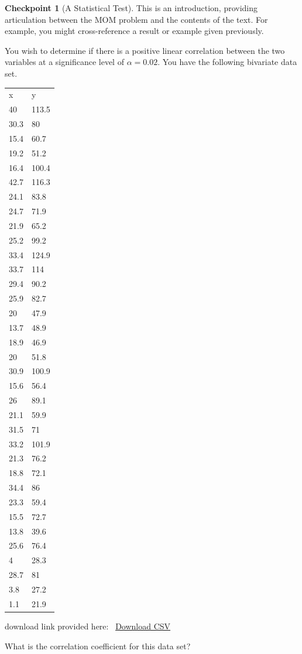 \documentclass{amsart}
\theoremstyle{plain}%
\theoremstyle{definition}%
\newtheorem{inlineexercise}[theorem]{Checkpoint}
\theoremstyle{remark}%
\newcommand{\tabularfont}{\relax}
\numberwithin{equation}{section}
\begin{document}
\begin{inlineexercise}[A Statistical Test]\label{section-myopenmath-4}%
%
This is an introduction, providing articulation between the MOM problem and the contents of the text.  For example, you might cross-reference a result or example given previously.%
\par
You wish to determine if there is a positive linear correlation between the two variables at a significance level of \(\displaystyle\alpha={0.02}\). You have the following bivariate data set.%
\begin{center}%
{\tabularfont%
\begin{tabular}{ll}
x&y\tabularnewline[0pt]
40&113.5\tabularnewline[0pt]
30.3&80\tabularnewline[0pt]
15.4&60.7\tabularnewline[0pt]
19.2&51.2\tabularnewline[0pt]
16.4&100.4\tabularnewline[0pt]
42.7&116.3\tabularnewline[0pt]
24.1&83.8\tabularnewline[0pt]
24.7&71.9\tabularnewline[0pt]
21.9&65.2\tabularnewline[0pt]
25.2&99.2\tabularnewline[0pt]
33.4&124.9\tabularnewline[0pt]
33.7&114\tabularnewline[0pt]
29.4&90.2\tabularnewline[0pt]
25.9&82.7\tabularnewline[0pt]
20&47.9\tabularnewline[0pt]
13.7&48.9\tabularnewline[0pt]
18.9&46.9\tabularnewline[0pt]
20&51.8\tabularnewline[0pt]
30.9&100.9\tabularnewline[0pt]
15.6&56.4\tabularnewline[0pt]
26&89.1\tabularnewline[0pt]
21.1&59.9\tabularnewline[0pt]
31.5&71\tabularnewline[0pt]
33.2&101.9\tabularnewline[0pt]
21.3&76.2\tabularnewline[0pt]
18.8&72.1\tabularnewline[0pt]
34.4&86\tabularnewline[0pt]
23.3&59.4\tabularnewline[0pt]
15.5&72.7\tabularnewline[0pt]
13.8&39.6\tabularnewline[0pt]
25.6&76.4\tabularnewline[0pt]
4&28.3\tabularnewline[0pt]
28.7&81\tabularnewline[0pt]
3.8&27.2\tabularnewline[0pt]
1.1&21.9
\end{tabular}
}%
\end{center}%
download link provided here:  \href{denied:data:text/csv;charset=UTF-8,\%22x\%22\%2C\%22y\%22\%0A40\%2C113.5\%0A30.3\%2C80\%0A15.4\%2C60.7\%0A19.2\%2C51.2\%0A16.4\%2C100.4\%0A42.7\%2C116.3\%0A24.1\%2C83.8\%0A24.7\%2C71.9\%0A21.9\%2C65.2\%0A25.2\%2C99.2\%0A33.4\%2C124.9\%0A33.7\%2C114\%0A29.4\%2C90.2\%0A25.9\%2C82.7\%0A20\%2C47.9\%0A13.7\%2C48.9\%0A18.9\%2C46.9\%0A20\%2C51.8\%0A30.9\%2C100.9\%0A15.6\%2C56.4\%0A26\%2C89.1\%0A21.1\%2C59.9\%0A31.5\%2C71\%0A33.2\%2C101.9\%0A21.3\%2C76.2\%0A18.8\%2C72.1\%0A34.4\%2C86\%0A23.3\%2C59.4\%0A15.5\%2C72.7\%0A13.8\%2C39.6\%0A25.6\%2C76.4\%0A4\%2C28.3\%0A28.7\%2C81\%0A3.8\%2C27.2\%0A1.1\%2C21.9}{Download CSV}\footnotemark{}%
\par
What is the correlation coefficient for this data set?%
\par

\end{inlineexercise}
\end{document}
